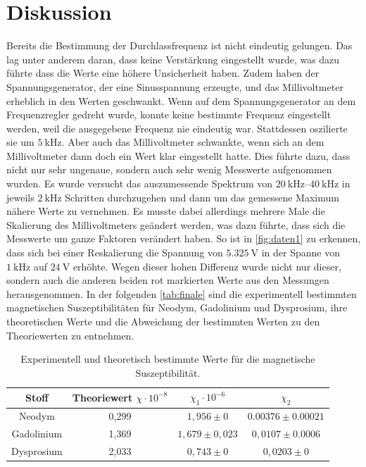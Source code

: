 \section{Diskussion}
\label{sec:Diskussion}
Bereits die Bestimmung der Durchlassfrequenz ist nicht eindeutig gelungen. Das lag unter anderem daran, dass keine Verstärkung eingestellt wurde, was dazu führte dass die Werte eine
höhere Unsicherheit haben. Zudem haben der Spannungsgenerator, der eine Sinusspannung erzeugte, und das Millivoltmeter erheblich in den Werten geschwankt. Wenn auf dem Spannungsgenerator an dem Frequenzregler gedreht wurde, 
konnte keine bestimmte Frequenz eingestellt werden, weil die ausgegebene Frequenz nie eindeutig war. Stattdessen oszilierte sie um $\SI{5}{\kilo\hertz}$.
Aber auch das Millivoltmeter schwankte, wenn sich an dem Millivoltmeter dann doch ein Wert klar eingestellt hatte. Dies führte dazu, dass nicht nur sehr ungenaue, sondern auch sehr wenig Messwerte aufgenommen wurden.
Es wurde versucht das auszumessende Spektrum von $\SIrange{20}{40}{\kilo\hertz}$ in jeweils $\SI{2}{\kilo\hertz}$ Schritten durchzugehen und dann um das gemessene Maximum nähere Werte zu vernehmen.
Es musste dabei allerdings mehrere Male die Skalierung des Millivoltmeters geändert werden, was dazu führte, dass sich die Messwerte um ganze Faktoren verändert haben. 
So ist in \autoref{fig:daten1} zu erkennen, dass sich bei einer Reskalierung die Spannung von $\SI{5,325}{\volt}$ in der Spanne von $\SI{1}{\kilo\hertz}$ auf $\SI{24}{\volt}$ erhöhte.
Wegen dieser hohen Differenz wurde nicht nur dieser, sondern auch die anderen beiden rot markierten Werte aus den Messungen herausgenommen. 
In der folgenden \autoref{tab:finale} sind die experimentell bestimmten magnetischen Suszeptibilitäten für Neodym, Gadolinium und Dysprosium, ihre theoretischen Werte und die Abweichung der bestimmten Werten zu den Theoriewerten zu entnehmen.
\begin{table}[H]
    \centering
    \caption{Experimentell und theoretisch bestimmte Werte für die magnetische Suszeptibilität.}
    \label{tab:finale}
    \begin{tabular}{c| c c c}
        \toprule
        Stoff & Theoriewert $\chi \cdot 10^{-8} $ & $\chi_1 \cdot 10^{-6}$ & $\chi_2$ \\
        \midrule
        Neodym & 0,299 & $1,956 \pm 0$ & $0.00376 \pm 0.00021$ \\
        Gadolinium & 1,369 & $1,679 \pm 0,023$ & $0,0107 \pm 0.0006$ \\
        Dysprosium & 2,033 &$0,743 \pm 0$ & $0,0203 \pm 0$ \\
      \bottomrule
    \end{tabular}
\end{table}

